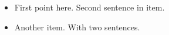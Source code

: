 \begin{itemize}
  \item First point here.
        Second sentence in item.
  \item Another item.
        With two sentences.
\end{itemize}

